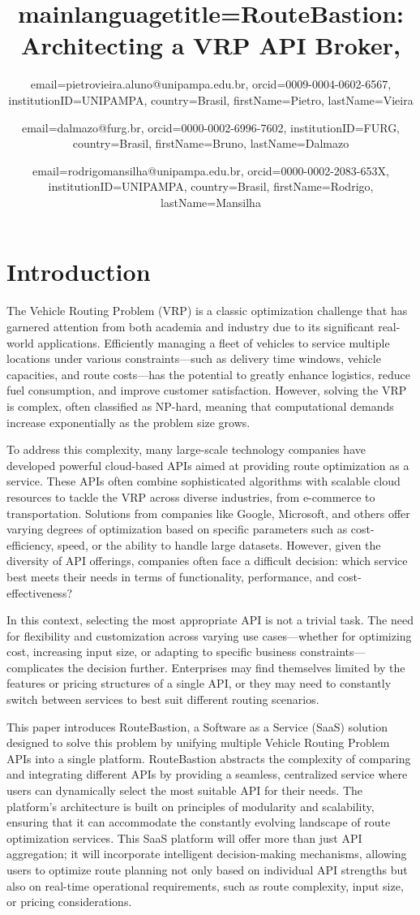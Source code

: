\documentclass[english,notblind]{sbc20}
\title
  {
    mainlanguagetitle={RouteBastion: Architecting a VRP API Broker},
  }
\author
  {
    email=pietrovieira.aluno@unipampa.edu.br,
    orcid=0009-0004-0602-6567,
    institutionID=UNIPAMPA,
    country=Brasil,
    firstName=Pietro,
    lastName=Vieira 
  }
\author
  {
    email=dalmazo@furg.br,
    orcid=0000-0002-6996-7602,
    institutionID=FURG,
    country=Brasil,
    firstName=Bruno,
    lastName=Dalmazo 
  }
\author
  {
    email=rodrigomansilha@unipampa.edu.br,
    orcid=0000-0002-2083-653X,
    institutionID=UNIPAMPA,
    country=Brasil,
    firstName=Rodrigo,
    lastName=Mansilha 
  }
\begin{document}
\maketitle

\section{Introduction}
\label{sec:intro}

The Vehicle Routing Problem (VRP) is a classic optimization challenge that has garnered attention from both academia and industry due to its significant real-world applications. Efficiently managing a fleet of vehicles to service multiple locations under various constraints—such as delivery time windows, vehicle capacities, and route costs—has the potential to greatly enhance logistics, reduce fuel consumption, and improve customer satisfaction. However, solving the VRP is complex, often classified as NP-hard, meaning that computational demands increase exponentially as the problem size grows.

To address this complexity, many large-scale technology companies have developed powerful cloud-based APIs aimed at providing route optimization as a service. These APIs often combine sophisticated algorithms with scalable cloud resources to tackle the VRP across diverse industries, from e-commerce to transportation. Solutions from companies like Google, Microsoft, and others offer varying degrees of optimization based on specific parameters such as cost-efficiency, speed, or the ability to handle large datasets. However, given the diversity of API offerings, companies often face a difficult decision: which service best meets their needs in terms of functionality, performance, and cost-effectiveness?

In this context, selecting the most appropriate API is not a trivial task. The need for flexibility and customization across varying use cases—whether for optimizing cost, increasing input size, or adapting to specific business constraints—complicates the decision further. Enterprises may find themselves limited by the features or pricing structures of a single API, or they may need to constantly switch between services to best suit different routing scenarios.

This paper introduces RouteBastion, a Software as a Service (SaaS) solution designed to solve this problem by unifying multiple Vehicle Routing Problem APIs into a single platform. RouteBastion abstracts the complexity of comparing and integrating different APIs by providing a seamless, centralized service where users can dynamically select the most suitable API for their needs. The platform’s architecture is built on principles of modularity and scalability, ensuring that it can accommodate the constantly evolving landscape of route optimization services. This SaaS platform will offer more than just API aggregation; it will incorporate intelligent decision-making mechanisms, allowing users to optimize route planning not only based on individual API strengths but also on real-time operational requirements, such as route complexity, input size, or pricing considerations.
\end{document}
